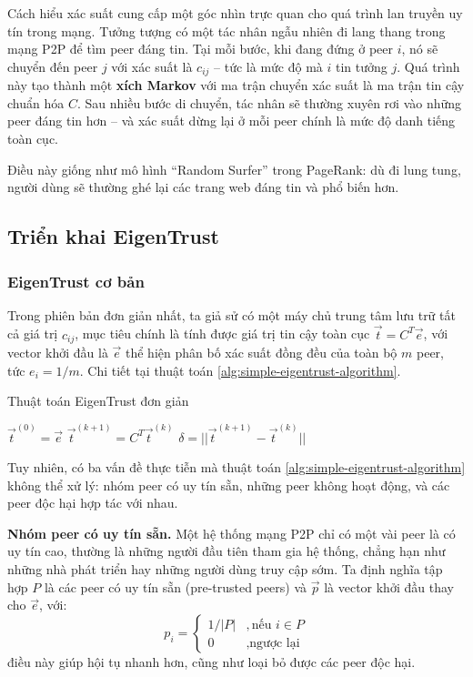 Cách hiểu xác suất cung cấp một góc nhìn trực quan cho quá trình lan truyền uy tín trong mạng. Tưởng tượng có một tác nhân ngẫu nhiên đi lang thang trong mạng P2P
để tìm peer đáng tin. Tại mỗi bước, khi đang đứng ở peer $i$, nó sẽ chuyển đến peer $j$ với xác suất là $c_{ij}$ -- tức là mức độ mà $i$ tin tưởng $j$.
Quá trình này tạo thành một \textbf{xích Markov} \cite{markov-chain} với ma trận chuyển xác suất là ma trận tin cậy chuẩn hóa $C$.
Sau nhiều bước di chuyển, tác nhân sẽ thường xuyên rơi vào những peer đáng tin hơn -- và xác suất dừng lại ở mỗi peer chính là mức độ danh tiếng toàn cục.

Điều này giống như mô hình ``Random Surfer'' \cite{random-suffer-model-pagerank} trong PageRank:
dù đi lung tung, người dùng sẽ thường ghé lại các trang web đáng tin và phổ biến hơn.

\subsection{Triển khai EigenTrust}

\subsubsection{EigenTrust cơ bản}

Trong phiên bản đơn giản nhất, ta giả sử có một máy chủ trung tâm lưu trữ tất cả giá trị $c_{ij}$, mục tiêu chính là tính được giá trị tin cậy toàn cục
$\vec{t} = C^{T}\vec{e}$, với vector khởi đầu là $\vec{e}$ thể hiện phân bố xác suất đồng đều của toàn bộ $m$ peer, tức $e_i = 1/m$.
Chi tiết tại thuật toán \ref{alg:simple-eigentrust-algorithm}.

\begin{algorithm}
  \caption{Thuật toán EigenTrust đơn giản}
  \label{alg:simple-eigentrust-algorithm}
  \begin{algorithmic}
    \State $\vec{t}^{(0)} = \vec{e}$
    \Repeat
    \State $\vec{t}^{(k+1)} = C^{T}\vec{t}^{(k)}$
    \State $\delta = || \vec{t}^{(k+1)} - \vec{t}^{(k)} ||$
    \Until{$\delta < \epsilon$}
  \end{algorithmic}
\end{algorithm}

Tuy nhiên, có ba vấn đề thực tiễn mà thuật toán \ref{alg:simple-eigentrust-algorithm} không thể xử lý: nhóm peer có uy tín sẵn, những peer không hoạt động, và các peer độc hại hợp tác với nhau.

\textbf{Nhóm peer có uy tín sẵn.} Một hệ thống mạng P2P chỉ có một vài peer là có uy tín cao, thường là những người đầu tiên tham gia hệ thống, chẳng hạn như những nhà phát triển hay những người dùng truy cập sớm.
Ta định nghĩa tập hợp $P$ là các peer có uy tín sẵn (pre-trusted peers) và $\vec{p}$ là vector khởi đầu thay cho $\vec{e}$, với:
\[
  p_i =
  \begin{cases}
    1/|P| & ,\text{nếu } i \in P \\
    0     & ,\text{ngược lại}
  \end{cases}
\]
điều này giúp hội tụ nhanh hơn, cũng như loại bỏ được các peer độc hại.

